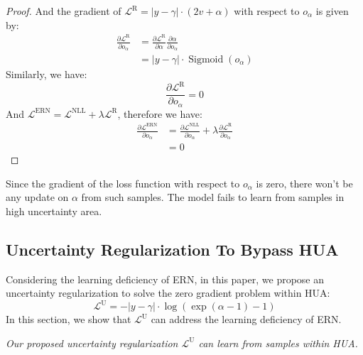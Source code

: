 \begin{proof}
And the gradient of $\mathcal{L}^{\mathrm{R}}=|y-\gamma| \cdot(2 v+\alpha)$ with respect to $o_{\alpha}$ is given by:
\begin{equation}
\begin{aligned}
    \frac{\partial \mathcal{L}^{\mathrm{R}}}{\partial o_\alpha}&=\frac{\partial \mathcal{L}^{\mathrm{R}}}{\partial \alpha} \frac{\partial \alpha}{\partial o_\alpha} \\
    &= |y-\gamma| \cdot \operatorname{Sigmoid}\left(o_\alpha\right)
\end{aligned}
\end{equation}
Similarly, we have:
\begin{equation}
    \frac{\partial \mathcal{L}^{\mathrm{R}}}{\partial o_\alpha} = 0
\end{equation}
And $\mathcal{L}^{\mathrm{ERN}}=\mathcal{L}^{\mathrm{NLL}}+\lambda \mathcal{L}^{\mathrm{R}}$, therefore we have:
\begin{equation}
\begin{aligned}
\frac{\partial \mathcal{L}^{\mathrm{ERN}}}{\partial o_\alpha} &= \frac{\partial \mathcal{L}^{\mathrm{NLL}}}{\partial o_\alpha} +\lambda \frac{\partial \mathcal{L}^{\mathrm{R}}}{\partial o_\alpha} \\
&=0
\end{aligned}
\end{equation}
\end{proof}

Since the gradient of the loss function with respect to $o_{\alpha}$ is zero, there won't be any update on $\alpha$ from such samples. The model fails to learn from samples in high uncertainty area.

\subsection{Uncertainty Regularization To Bypass HUA}
Considering the learning deficiency of ERN, in this paper, we propose an uncertainty regularization to solve the zero gradient problem within HUA:
\begin{equation}
    \mathcal{L}^{\mathrm{U}} =  -| y-\gamma | \cdot  \log(\exp(\alpha-1)-1) 
\end{equation}
In this section, we show that $\mathcal{L}^{\mathrm{U}}$ can address the learning deficiency of ERN.
\begin{theorem}
\textit{Our proposed uncertainty regularization $\mathcal{L}^{\mathrm{U}}$ can learn from samples within HUA.}
\end{theorem}

